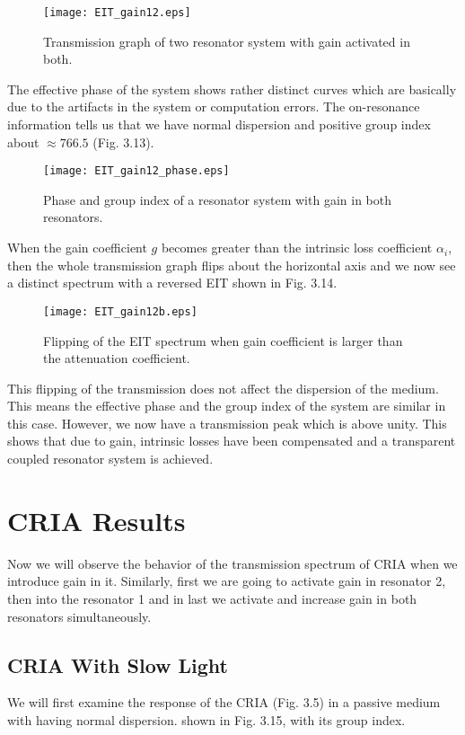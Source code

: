 \begin{figure}[h]
\centering
\texttt{[image: EIT\_gain12.eps]}
\caption{Transmission graph of two resonator system with gain activated in both.}
\end{figure}

The effective phase of the system shows rather distinct curves which are basically due to the artifacts in the system or computation errors. The on-resonance information tells us that we have normal dispersion and positive group index about $\approx 766.5$ (Fig. 3.13). 

\begin{figure}[h]
\centering
\texttt{[image: EIT\_gain12\_phase.eps]}
\caption{Phase and group index of a resonator system with gain in both resonators.}
\end{figure}

When the gain coefficient $g$ becomes greater than the intrinsic loss coefficient $\alpha_{i}$, then the whole transmission graph flips about the horizontal axis and we now see a distinct spectrum with a reversed EIT shown in Fig. 3.14.

\begin{figure}[h]
\centering
\texttt{[image: EIT\_gain12b.eps]}
\caption{Flipping of the EIT spectrum when gain coefficient is larger than the attenuation coefficient.}
\end{figure}

This flipping of the transmission does not affect the dispersion of the medium. This means the effective phase and the group index of the system are similar in this case. However, we now have a transmission peak which is above unity. This shows that due to gain, intrinsic losses have been compensated and a transparent coupled resonator system is achieved.


  

\section{CRIA Results}
Now we will observe the behavior of the transmission spectrum of CRIA when we introduce gain in it. Similarly, first we are going to activate gain in resonator 2, then into the resonator 1 and in last we activate and increase gain in both resonators simultaneously. 

\subsection{CRIA With Slow Light}
We will first examine the response of the CRIA (Fig. 3.5) in a passive medium with having normal dispersion. shown in Fig. 3.15, with its group index.

